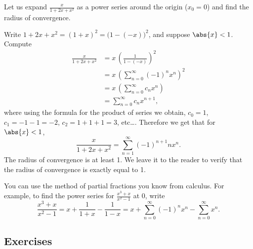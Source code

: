 \documentclass[12pt]{book}
\begin{document}
\begin{example}
Let us expand $\frac{x}{1+2x+x^2}$ as a power series around the origin ($x_0 = 0$) and
find the radius of convergence.

Write $1+2x+x^2 = {(1+x)}^2 = {\bigl(1-(-x)\bigr)}^2$, and suppose
$\abs{x} < 1$.
Compute
\begin{equation*}
\begin{split}
\frac{x}{1+2x+x^2}
&=
x \,
{\left(
\frac{1}{1-(-x)}
\right)}^2
\\
&=
x \,
{\left( 
\sum_{n=0}^\infty {(-1)}^n x^n 
\right)}^2
\\
&=
x \,
\left(
\sum_{n=0}^\infty c_n x^n 
\right)
\\
&=
\sum_{n=0}^\infty c_n x^{n+1} ,
\end{split}
\end{equation*}
where using the formula for the product of series
we obtain, $c_0 = 1$, $c_1 = -1 -1 = -2$, $c_2 = 1+1+1 = 3$, etc\ldots.
Therefore we get that for $\abs{x} < 1$, 
\begin{equation*}
\frac{x}{1+2x+x^2}
=
\sum_{n=1}^\infty {(-1)}^{n+1} n x^n .
\end{equation*}
The radius of convergence is at least 1.
We leave it to the reader to
verify that the radius of convergence is exactly equal to 1.
\end{example}

You can use the method of partial fractions you know from calculus.
For example, to find the power series for $\frac{x^3+x}{x^2-1}$ at 0, write
\begin{equation*}
\frac{x^3+x}{x^2-1}
=
x + \frac{1}{1+x} - \frac{1}{1-x}
=
x + \sum_{n=0}^\infty {(-1)}^n x^n - \sum_{n=0}^\infty x^n .
\end{equation*}

\subsection*{Exercises}

%
\end{document}
